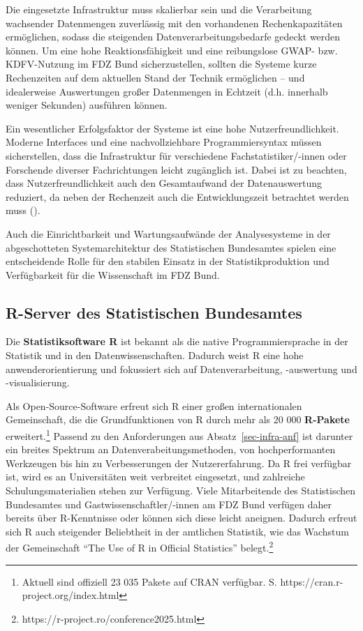 \documentclass[
  german,
  10pt,
  twoside]{article}
\let\oldtextbf\textbf
\renewcommand{\textbf}[1]{{\color{wistaBlue}\oldtextbf{#1}}}
\let\oldref\ref
\renewcommand{\ref}[1]{\oldref{#1}\raisebox{-0.2ex}{\scriptsize\color{wistaBlue}\ding{247}}}
\begin{document}
Die eingesetzte Infrastruktur muss skalierbar sein und die Verarbeitung
wachsender Datenmengen zuverlässig mit den vorhandenen Rechenkapazitäten
ermöglichen, sodass die steigenden Datenverarbeitungsbedarfe gedeckt
werden können. Um eine hohe Reaktionsfähigkeit und eine reibungslose
GWAP- bzw. KDFV-Nutzung im FDZ Bund sicherzustellen, sollten die Systeme
kurze Rechenzeiten auf dem aktuellen Stand der Technik ermöglichen --
und idealerweise Auswertungen großer Datenmengen in Echtzeit (d.h.
innerhalb weniger Sekunden) ausführen können.

Ein wesentlicher Erfolgsfaktor der Systeme ist eine hohe
Nutzerfreundlichkeit. Moderne Interfaces und eine nachvollziehbare
Programmiersyntax müssen sicherstellen, dass die Infrastruktur für
verschiedene Fachstatistiker/-innen oder Forschende diverser
Fachrichtungen leicht zugänglich ist. Dabei ist zu beachten, dass
Nutzerfreundlichkeit auch den Gesamtaufwand der Datenauswertung
reduziert, da neben der Rechenzeit auch die Entwicklungszeit betrachtet
werden muss (\textcite{gomolka2021largedata}).

Auch die Einrichtbarkeit und Wartungsaufwände der Analysesysteme in der
abgeschotteten Systemarchitektur des Statistischen Bundesamtes spielen
eine entscheidende Rolle für den stabilen Einsatz in der
Statistikproduktion und Verfügbarkeit für die Wissenschaft im FDZ Bund.

\subsection{R-Server des Statistischen
Bundesamtes}\label{r-server-des-statistischen-bundesamtes}

Die \textbf{Statistiksoftware R} ist bekannt als die native
Programmiersprache in der Statistik und in den Datenwissenschaften.
Dadurch weist R eine hohe anwenderorientierung und fokussiert sich auf
Datenverarbeitung, -auswertung und -visualisierung.

Als Open-Source-Software erfreut sich R einer großen internationalen
Gemeinschaft, die die Grundfunktionen von R durch mehr als 20 000
\textbf{R-Pakete} erweitert.\footnote{Aktuell sind offiziell 23 035
  Pakete auf CRAN verfügbar. S. https://cran.r-project.org/index.html}
Passend zu den Anforderungen aus Absatz~\ref{sec-infra-anf} ist darunter
ein breites Spektrum an Datenverabeitungsmethoden, von hochperformanten
Werkzeugen bis hin zu Verbesserungen der Nutzererfahrung. Da R frei
verfügbar ist, wird es an Universitäten weit verbreitet eingesetzt, und
zahlreiche Schulungsmaterialien stehen zur Verfügung. Viele
Mitarbeitende des Statistischen Bundesamtes und
Gastwissenschaftler/-innen am FDZ Bund verfügen daher bereits über
R-Kenntnisse oder können sich diese leicht aneignen. Dadurch erfreut
sich R auch steigender Beliebtheit in der amtlichen Statistik, wie das
Wachstum der Gemeinschaft ``The Use of R in Official Statistics''
belegt.\footnote{https://r-project.ro/conference2025.html}
\end{document}
